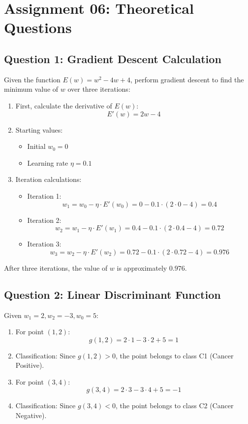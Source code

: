 \documentclass{article}
\begin{document}
\section*{Assignment 06: Theoretical Questions}

\subsection*{Question 1: Gradient Descent Calculation}
Given the function \( E(w) = w^2 - 4w + 4 \), perform gradient descent to find the minimum value of \( w \) over three iterations:
\begin{enumerate}
    \item First, calculate the derivative of \( E(w) \):
    \[
    E'(w) = 2w - 4
    \]

    \item Starting values:
    \begin{itemize}
        \item Initial \( w_0 = 0 \)
        \item Learning rate \( \eta = 0.1 \)
    \end{itemize}

    \item Iteration calculations:
    \begin{itemize}
        \item Iteration 1:
        \[
        w_1 = w_0 - \eta \cdot E'(w_0) = 0 - 0.1 \cdot (2 \cdot 0 - 4) = 0.4
        \]
        \item Iteration 2:
        \[
        w_2 = w_1 - \eta \cdot E'(w_1) = 0.4 - 0.1 \cdot (2 \cdot 0.4 - 4) = 0.72
        \]
        \item Iteration 3:
        \[
        w_3 = w_2 - \eta \cdot E'(w_2) = 0.72 - 0.1 \cdot (2 \cdot 0.72 - 4) = 0.976
        \]
    \end{itemize}
\end{enumerate}
After three iterations, the value of \( w \) is approximately \( 0.976 \).

\subsection*{Question 2: Linear Discriminant Function}
Given \( w_1 = 2, w_2 = -3, w_0 = 5 \):
\begin{enumerate}
    \item For point \( (1, 2) \):
    \[
    g(1, 2) = 2 \cdot 1 - 3 \cdot 2 + 5 = 1
    \]
    \item Classification: Since \( g(1, 2) > 0 \), the point belongs to class C1 (Cancer Positive).

    \item For point \( (3, 4) \):
    \[
    g(3, 4) = 2 \cdot 3 - 3 \cdot 4 + 5 = -1
    \]
    \item Classification: Since \( g(3, 4) < 0 \), the point belongs to class C2 (Cancer Negative).
\end{enumerate}
\end{document}
